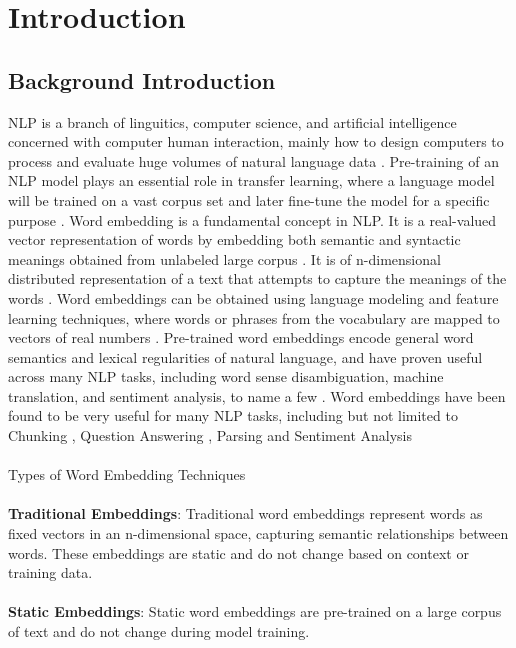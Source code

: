      \chapter{Introduction}
        \section{Background Introduction}
        NLP is a branch of linguitics, computer science, and artificial intelligence concerned with computer human interaction, mainly how to design computers to process and evaluate huge volumes of natural language data \cite{asudani2023impact}. Pre-training of an NLP model plays an essential role in transfer learning, where a language model will be trained on a vast corpus set and later fine-tune the model for a specific purpose \cite{NepaliBERT}. Word embedding is a fundamental concept in NLP. It is a real-valued vector representation of words by embedding both semantic and syntactic meanings obtained from unlabeled large corpus \cite{Wang_Wang_Chen_Wang_Kuo_2019}. It is of n-dimensional distributed representation of a text that attempts to capture the meanings of the words \cite{asudani2023impact}. Word embeddings can be obtained using language modeling and feature learning techniques, where words or phrases from the vocabulary are mapped to vectors of real numbers \cite{enwiki:1219561882}. Pre-trained word embeddings encode general word semantics and lexical regularities of natural language, and have proven useful across many NLP tasks, including word sense disambiguation, machine translation, and sentiment analysis, to name a few \cite{moreo2019wordclass}. Word embeddings have been found to be very useful for many NLP tasks, including but not limited to Chunking \cite{turian-etal-2010-word}, Question Answering \cite{questionanswer}, Parsing and Sentiment Analysis \cite{sentimentanalysis} \cite{wordembedding} \\\\
        Types of Word Embedding Techniques  \cite{reviewOnWordEmbedding} \\\\
        \textbf{Traditional Embeddings}: Traditional word embeddings represent words as fixed vectors in an n-dimensional space, capturing semantic relationships between words.
        These embeddings are static and do not change based on context or training data. \\\\
        \textbf{Static Embeddings}:
        Static word embeddings are pre-trained on a large corpus of text and do not change during model training.
